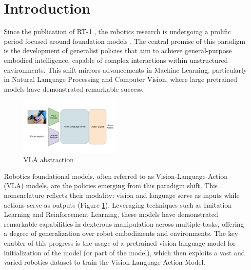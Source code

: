 \section{Introduction}

Since the publication of RT-1 \cite{RT-1}, the robotics research is undergoing a prolific period focused around foundation models \cite{FoundationalModels}. The central promise of this paradigm is the development of generalist policies that aim to achieve general-purpose embodied intelligence, capable of complex interactions within unstructured environments. This shift mirrors advancements in Machine Learning, particularly in Natural Language Processing and Computer Vision, where large pretrained models have demonstrated remarkable success.

\begin{figure}
    \vspace{-15pt}
    \centering
    \includegraphics[width=0.45\textwidth]{images/vla.jpg}
    \caption{VLA abstraction}
    \label{fig:vla_abstraction}
    \vspace{-15pt}
\end{figure}

Robotics foundational models, often referred to as Vision-Language-Action (VLA) models, are the policies 
emerging from this paradigm shift. This nomenclature reflects their modality: vision and language serve as inputs while 
actions serve as outputs (Figure \ref{fig:vla_abstraction}). Leveraging techniques such as Imitation Learning and 
Reinforcement Learning, these models have demonstrated remarkable capabilities in dexterous manipulation across multiple tasks, 
offering a degree of generalization over robot embodiments and environments. The key enabler of this progress is the 
usage of a pretrained vision language model for initialization of the model (or part of the model), which then 
exploits a vast and varied robotics dataset to train the Vision Language Action Model.

